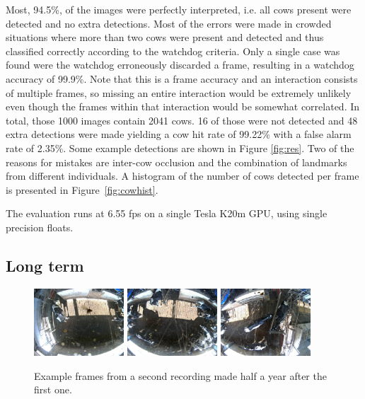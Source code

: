\documentclass{cta-author}
\begin{document}
Most, 94.5\%, of the images were perfectly interpreted, i.e. all cows present were detected and no extra
detections.
Most of the errors were made in crowded situations where more than two cows were present and detected and
thus classified correctly according to the watchdog criteria. Only a single case was found were the watchdog
erroneously discarded a frame, resulting in a watchdog accuracy of 99.9\%. Note that this is a frame
accuracy and an interaction consists of multiple frames, so missing an entire interaction would be extremely
unlikely even though the frames within that interaction would be somewhat correlated. In total,
those 1000 images contain 2041 cows. 16 of those were not detected and 48 extra detections were made yielding
a cow hit rate of 99.22\% with a false alarm rate of 2.35\%. Some example detections are shown in Figure
\ref{fig:res}.
Two of the reasons for mistakes are inter-cow occlusion and the combination of landmarks from different
individuals. A
histogram of the number of cows detected per frame is presented in Figure~\ref{fig:cowhist}.

The evaluation runs at 6.55 fps on a single Tesla K20m GPU, using single precision floats.

\subsection{Long term}
\begin{figure}[tb]
\begin{center}
  \includegraphics[width=0.3\textwidth]{new-2.jpg}
  \includegraphics[width=0.3\textwidth]{new-1.jpg}
  \includegraphics[width=0.3\textwidth]{new-0.jpg}
\end{center}
  \caption{Example frames from a second recording made half a year after the first one.}
  \label{fig:new}
\end{figure}
\end{document}
